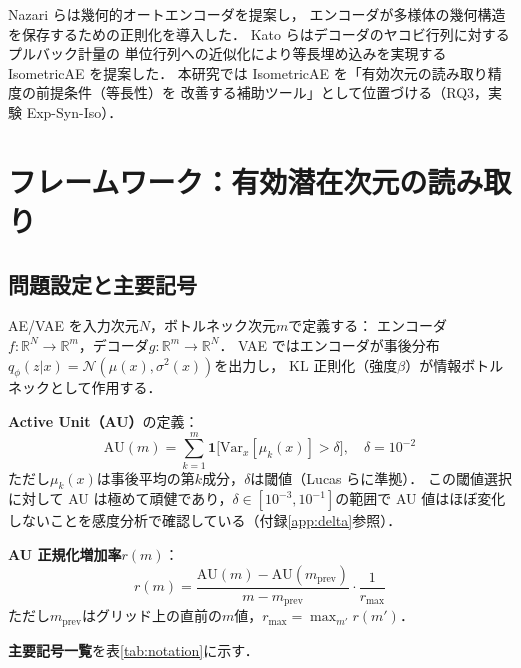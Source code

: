 \documentclass[11pt,a4paper]{jsarticle}
\newcommand{\R}{\mathbb{R}}
\begin{document}
Nazari ら\cite{nazari2023geometric}は幾何的オートエンコーダを提案し，
エンコーダが多様体の幾何構造を保存するための正則化を導入した．
Kato ら\cite{kato2020rdae}はデコーダのヤコビ行列に対するプルバック計量の
単位行列への近似化により等長埋め込みを実現する IsometricAE を提案した．
本研究では IsometricAE を「有効次元の読み取り精度の前提条件（等長性）を
改善する補助ツール」として位置づける（RQ3，実験 Exp-Syn-Iso）．

\section{フレームワーク：有効潜在次元の読み取り}\label{sec:framework}

\subsection{問題設定と主要記号}\label{sec:framework_setup}

AE/VAE を入力次元$N$，ボトルネック次元$m$で定義する：
エンコーダ$f: \R^N \to \R^m$，デコーダ$g: \R^m \to \R^N$．
VAE ではエンコーダが事後分布$q_\phi(z|x) = \mathcal{N}(\mu(x), \sigma^2(x))$を出力し，
KL 正則化（強度$\beta$）が情報ボトルネックとして作用する．

\textbf{Active Unit（AU）}の定義：
\begin{equation}
  \mathrm{AU}(m) = \sum_{k=1}^{m} \mathbf{1}\bigl[\mathrm{Var}_x[\mu_k(x)] > \delta\bigr],
  \quad \delta = 10^{-2}
  \label{eq:au_def}
\end{equation}
ただし$\mu_k(x)$は事後平均の第$k$成分，$\delta$は閾値（Lucas ら\cite{lucas2019elbo}に準拠）．
この閾値選択に対して AU は極めて頑健であり，$\delta \in [10^{-3}, 10^{-1}]$の範囲で AU 値はほぼ変化しないことを感度分析で確認している（付録\ref{app:delta}参照）．

\textbf{AU 正規化増加率}$r(m)$：
\begin{equation}
  r(m) = \frac{\mathrm{AU}(m) - \mathrm{AU}(m_{\mathrm{prev}})}{m - m_{\mathrm{prev}}} \cdot \frac{1}{r_{\max}}
  \label{eq:au_rate}
\end{equation}
ただし$m_{\mathrm{prev}}$はグリッド上の直前の$m$値，$r_{\max} = \max_{m'} r(m')$．

\textbf{主要記号一覧}を表\ref{tab:notation}に示す．
\end{document}
